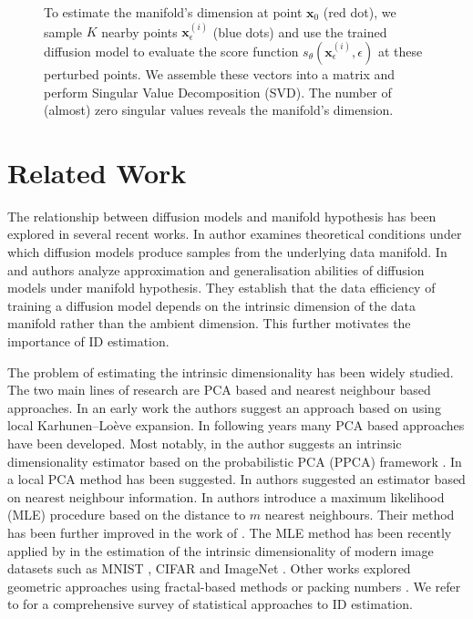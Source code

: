 \begin{figure}[h]
\begin{minipage}[t]{0.49\linewidth}
        \caption{To estimate the manifold's dimension at point \(\mathbf{x}_0\) (red dot), we sample \(K\) nearby points \(\mathbf{x}_{\epsilon}^{(i)}\) (blue dots) and use the trained diffusion model to evaluate the score function \(s_\theta(\mathbf{x}_\epsilon^{(i)}, \epsilon)\) at these perturbed points. We assemble these vectors into a matrix and perform Singular Value Decomposition (SVD). The number of (almost) zero singular values reveals the manifold's dimension.}
        \label{ch3:fig:zoom}
    \end{minipage}
\end{figure}


\section{Related Work}
\label{ch3:sec:related_work}
The relationship between diffusion models and manifold hypothesis has been explored in several recent works. In \cite{pidstrigach2022manifold_jakiw} author examines theoretical conditions under which diffusion models produce samples from the underlying data manifold. In \cite{oko2023diffusion_mini_max} and \cite{chen2023manifold_linear} authors analyze approximation and generalisation abilities of diffusion models under manifold hypothesis. They establish that the data efficiency of training a diffusion model depends on the intrinsic dimension of the data manifold rather than the ambient dimension. This further motivates the importance of ID estimation.


The problem of estimating the intrinsic dimensionality has been widely studied. The two main lines of research are PCA based and nearest neighbour based approaches. In an early work \cite{Karhunen-Loeve} the authors suggest an approach based on using local Karhunen–Loève expansion. In following years many PCA based approaches have been developed. Most notably, in \cite{auto_ppca} the author suggests an intrinsic dimensionality estimator based on the probabilistic PCA (PPCA) framework \cite{ppca}. In \cite{fan_local_pca} a local PCA method has been suggested. In \cite{pettis_nn_dim_estimator} authors suggested an estimator based on nearest neighbour information.  In \cite{dim_MLE} authors introduce a maximum likelihood (MLE)  procedure based on the distance to $m$ nearest neighbours. Their method has been further improved in the work of \cite{haro_mle}. The MLE method has been recently applied by \cite{pope2021intrinsic} in the estimation of the intrinsic dimensionality of modern image datasets such as MNIST \cite{mnist}, CIFAR \cite{cifar} and ImageNet \cite{imagenet}. Other works explored geometric approaches using fractal-based methods \cite{fractal_dim} or packing numbers \cite{packing_number}. We refer to \cite{campadelli2015intrinsic} for a comprehensive survey of statistical approaches to ID estimation.

